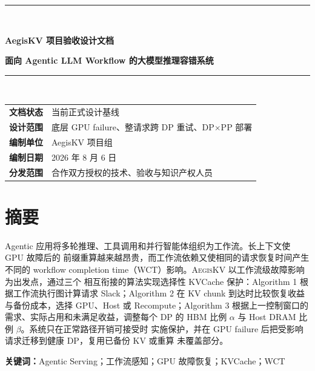 \documentclass[UTF8,11pt,a4paper]{ctexart}
\newcommand{\systemname}{\textsc{AegisKV}}
\begin{document}
\hypersetup{pageanchor=false}
\begin{titlepage}
  \centering
  \vspace*{1.7cm}
  {\color{AegisBlue}\rule{\textwidth}{1.1pt}}\\[0.9cm]
  {\bfseries AegisKV 项目验收设计文档\par}
  \vspace{0.5cm}
  {\bfseries 面向 Agentic LLM Workflow 的大模型推理容错系统\par}
  \vspace{0.9cm}
  {\color{AegisBlue}\rule{\textwidth}{1.1pt}}\\[1.4cm]

  \begin{tabular}{>{\bfseries}p{3.5cm}p{8.6cm}}
    文档状态 & 当前正式设计基线 \\
    设计范围 & 底层 GPU failure、整请求跨 DP 重试、DP$\times$PP 部署 \\
    编制单位 & AegisKV 项目组 \\
    编制日期 & 2026 年 8 月 6 日 \\
    分发范围 & 合作双方授权的技术、验收与知识产权人员 \\
  \end{tabular}
  \vfill
\end{titlepage}

\hypersetup{pageanchor=true}

\section*{摘要}

Agentic 应用将多轮推理、工具调用和并行智能体组织为工作流。长上下文使 GPU 故障后的
前缀重算越来越昂贵，而工作流依赖又使相同的请求恢复时间产生不同的 workflow
completion time（WCT）影响。\systemname{} 以工作流级故障影响为出发点，通过三个
相互衔接的算法实现选择性 KVCache 保护：Algorithm 1 根据工作流执行图计算请求
Slack；Algorithm 2 在 KV chunk 到达时比较恢复收益与备份成本，选择 GPU、Host 或
Recompute；Algorithm 3 根据上一控制窗口的需求、实际占用和未满足收益，调整每个
DP 的 HBM 比例 $\alpha$ 与 Host DRAM 比例 $\beta$。系统只在正常路径开销可接受时
实施保护，并在 GPU failure 后把受影响请求迁移到健康 DP，复用已备份 KV 或重算
未覆盖部分。

\textbf{关键词：}Agentic Serving；工作流感知；GPU 故障恢复；KVCache；WCT

\clearpage
\tableofcontents
\clearpage
{}
\end{document}
